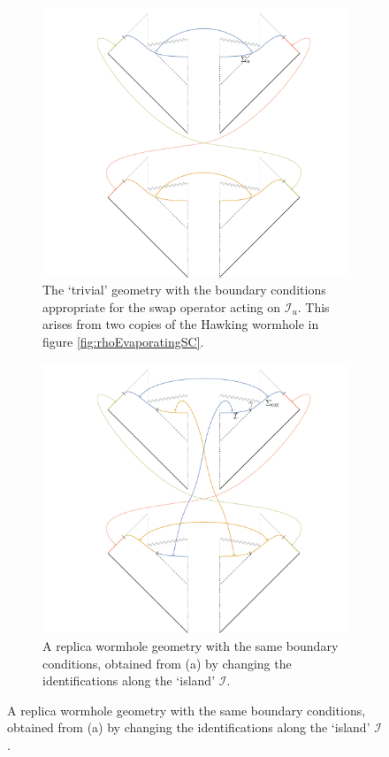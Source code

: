 \documentclass[letterpaper,12pt]{article}
\newcommand*{\scri}{\mathscr{I}} %
\newcommand*{\island}{\mathcal{I}}
\begin{document}
%
\begin{figure}
\centering
\begin{subfigure}[t]{.49\textwidth}\centering
	\includegraphics[width=.8\textwidth]{ReplicaWormhole1}
	\caption{The `trivial' geometry with the boundary conditions appropriate for the swap operator acting on $\scri_u$. This arises from two copies of the Hawking wormhole in figure \ref{fig:rhoEvaporatingSC}.}
\label{fig:replicarho2a}
\end{subfigure}
\hfill
\begin{subfigure}[t]{.49\textwidth}\centering
	\includegraphics[width=.8\textwidth]{ReplicaWormhole2}
		\caption{A replica wormhole geometry with the same boundary conditions, obtained from (a) by changing the identifications along the `island' $\island$.}
\label{fig:replicarho2b}

\end{subfigure}
\end{figure}
\end{document}
